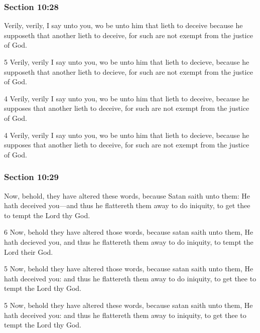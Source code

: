 	\subsubsection{Section 10:28} %
		\label{DC10-28}

		Verily, verily, I say unto you, wo be unto him that lieth to deceive because he supposeth that another lieth to deceive, for such are not exempt from the justice of God.

		\begin{framed}
		\scriptsize
			\begin{compactdesc}
				\item[JSP] 5 Verily, verily I say unto you, wo be unto him that lieth to decieve, because he supposeth that another lieth to decieve, for such are not exempt from the justice of God.
				\item[RB1] [\textit{missing}] 
				\item[DC 1835] 4 Verily, verily I say unto you, wo be unto him that lieth to deceive, because he supposes that another lieth to deceive, for such are not exempt from the justice of God.
				\item[DC 1844] 4 Verily, verily I say unto you, wo be unto him that lieth to decieve, because he supposes that another lieth to deceive, for such are not exempt from the justice of God.
			\end{compactdesc}
		\end{framed}

	\subsubsection{Section 10:29} %
		\label{DC10-29}

		Now, behold, they have altered these words, because Satan saith unto them: He hath deceived you---and thus he flattereth them away to do iniquity, to get thee to tempt the Lord thy God.

		\begin{framed}
		\scriptsize
			\begin{compactdesc}
				\item[JSP] 6 Now, behold they have altered those words, because satan saith unto them, He hath decieved you, and thus he flattereth them away to do iniquity, to tempt the Lord their God.
				\item[RB1] [\textit{missing}] 
				\item[DC 1835] 5 Now, behold they have altered those words, because satan saith unto them, He hath deceived you: and thus he flattereth them away to do iniquity, to get thee to tempt the Lord thy God.
				\item[DC 1844] 5 Now, behold they have altered these words, because satan saith unto them, He hath deceived you: and thus he flattereth them away to iniquity, to get thee to tempt the Lord thy God.
			\end{compactdesc}
		\end{framed}


